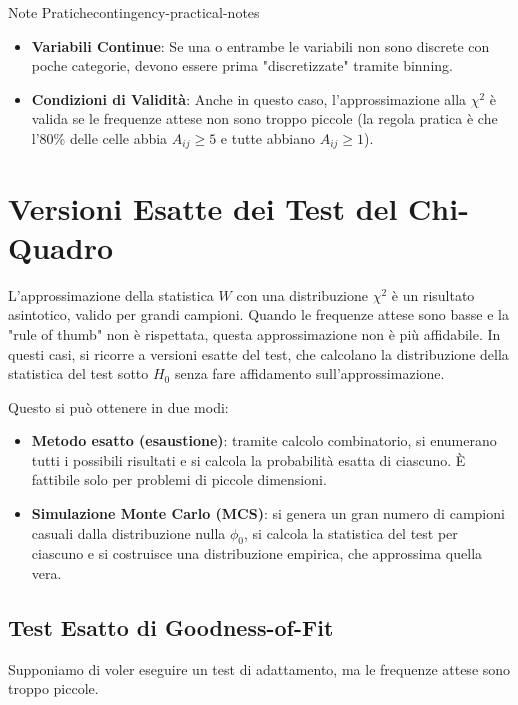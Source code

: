 \begin{nota}{Note Pratiche}{contingency-practical-notes}
\begin{itemize}
    \item \textbf{Variabili Continue}: Se una o entrambe le variabili non sono
    discrete con poche categorie, devono essere prima "discretizzate" tramite
    binning.
    \item \textbf{Condizioni di Validità}: Anche in questo caso,
    l'approssimazione alla \(\chi^2\) è valida se le frequenze attese non sono
    troppo piccole (la regola pratica è che l'80\% delle celle abbia \(A_{ij}
    \ge 5\) e tutte abbiano \(A_{ij} \ge 1\)).
\end{itemize}
\end{nota}


\section{Versioni Esatte dei Test del Chi-Quadro}
L'approssimazione della statistica \(W\) con una distribuzione \(\chi^2\) è un
risultato asintotico, valido per grandi campioni. Quando le frequenze attese
sono basse e la "rule of thumb" non è rispettata, questa approssimazione non è
più affidabile. In questi casi, si ricorre a versioni esatte del test, che
calcolano la distribuzione della statistica del test sotto \(H_0\) senza fare
affidamento sull'approssimazione.

Questo si può ottenere in due modi:
\begin{itemize}
    \item \textbf{Metodo esatto (esaustione)}: tramite calcolo combinatorio, si
    enumerano tutti i possibili risultati e si calcola la probabilità esatta di
    ciascuno. È fattibile solo per problemi di piccole dimensioni.
    \item \textbf{Simulazione Monte Carlo (MCS)}: si genera un gran numero di
    campioni casuali dalla distribuzione nulla \(\phi_0\), si calcola la
    statistica del test per ciascuno e si costruisce una distribuzione empirica,
    che approssima quella vera.
\end{itemize}

\subsection{Test Esatto di Goodness-of-Fit}
Supponiamo di voler eseguire un test di adattamento, ma le frequenze attese sono
troppo piccole.

